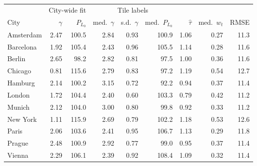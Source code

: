 \begin{tabular}{lrrrrrrrr}
\toprule
& \multicolumn{2}{c}{City-wide fit} & \multicolumn{3}{c}{Tile labels} & & & \\
\cmidrule(lr){2-3}\cmidrule(lr){4-6}
City & $\gamma$ & $P_{L_0}$ & med.\ $\gamma$ & s.d.\ $\gamma$ & med.\ $P_{L_0}$ & $\hat\tau$ & med.\ $w_t$ & RMSE \\
\midrule
Amsterdam & 2.47 & 100.5 & 2.84 & 0.93 & 100.9 & 1.06 & 0.27 & 11.3 \\
Barcelona & 1.92 & 105.4 & 2.43 & 0.96 & 105.5 & 1.14 & 0.28 & 11.6 \\
Berlin & 2.65 & 98.2 & 2.82 & 0.81 & 97.5 & 1.00 & 0.36 & 11.6 \\
Chicago & 0.81 & 115.6 & 2.79 & 0.83 & 97.2 & 1.19 & 0.54 & 12.7 \\
Hamburg & 2.14 & 100.2 & 3.15 & 0.72 & 92.2 & 0.94 & 0.37 & 11.4 \\
London & 1.72 & 104.4 & 2.40 & 0.60 & 103.3 & 0.79 & 0.42 & 11.2 \\
Munich & 2.12 & 104.0 & 3.00 & 0.80 & 99.8 & 0.92 & 0.33 & 11.2 \\
New York & 1.11 & 115.9 & 2.69 & 0.79 & 102.2 & 1.18 & 0.53 & 12.6 \\
Paris & 2.06 & 103.6 & 2.41 & 0.95 & 106.7 & 1.13 & 0.29 & 11.8 \\
Prague & 2.48 & 100.9 & 2.92 & 0.77 & 99.0 & 0.95 & 0.37 & 11.4 \\
Vienna & 2.29 & 106.1 & 2.39 & 0.92 & 108.4 & 1.09 & 0.32 & 11.4 \\
\bottomrule
\end{tabular}

